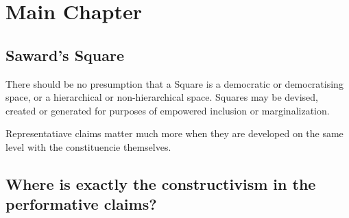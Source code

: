
\chapter{Main Chapter}\label{chap:Main Chapter} %

%
%


\section{Saward's Square}\label{sec:Saward's Square} %

\epigraph{There should be no presumption that a Square is a democratic or democratising space, or a hierarchical or non-hierarchical space. Squares may be devised, created or generated for purposes of empowered inclusion or marginalization.}{\cite[11]{saward2024}}

Representatiave claims matter much more when they are developed on the same
level with the constituencie themselves.

\section{Where is exactly the constructivism in the performative claims?}\label{sec:Where is exactly the construction in the construtivist turn?} %

